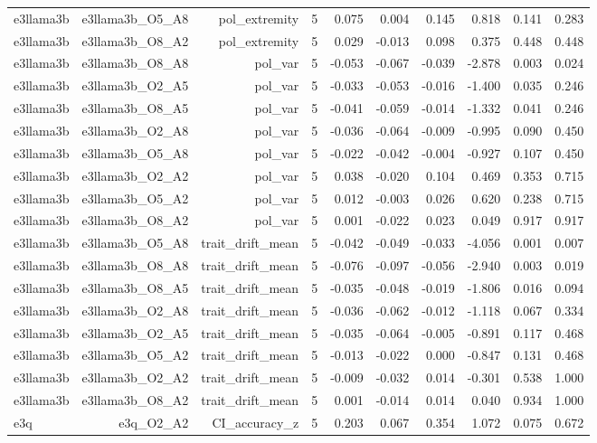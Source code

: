 \documentclass[11pt]{article}
\begin{document}
\begin{landscape}
\begin{longtable}{@{}lrrrrrrrrr@{}}
e3llama3b & e3llama3b\_O5\_A8 & pol\_extremity & 5 & 0.075 & 0.004 & 0.145 & 0.818 & 0.141 & 0.283 \\
e3llama3b & e3llama3b\_O8\_A2 & pol\_extremity & 5 & 0.029 & -0.013 & 0.098 & 0.375 & 0.448 & 0.448 \\
e3llama3b & e3llama3b\_O8\_A8 & pol\_var & 5 & -0.053 & -0.067 & -0.039 & -2.878 & 0.003 & 0.024 \\
e3llama3b & e3llama3b\_O2\_A5 & pol\_var & 5 & -0.033 & -0.053 & -0.016 & -1.400 & 0.035 & 0.246 \\
e3llama3b & e3llama3b\_O8\_A5 & pol\_var & 5 & -0.041 & -0.059 & -0.014 & -1.332 & 0.041 & 0.246 \\
e3llama3b & e3llama3b\_O2\_A8 & pol\_var & 5 & -0.036 & -0.064 & -0.009 & -0.995 & 0.090 & 0.450 \\
e3llama3b & e3llama3b\_O5\_A8 & pol\_var & 5 & -0.022 & -0.042 & -0.004 & -0.927 & 0.107 & 0.450 \\
e3llama3b & e3llama3b\_O2\_A2 & pol\_var & 5 & 0.038 & -0.020 & 0.104 & 0.469 & 0.353 & 0.715 \\
e3llama3b & e3llama3b\_O5\_A2 & pol\_var & 5 & 0.012 & -0.003 & 0.026 & 0.620 & 0.238 & 0.715 \\
e3llama3b & e3llama3b\_O8\_A2 & pol\_var & 5 & 0.001 & -0.022 & 0.023 & 0.049 & 0.917 & 0.917 \\
e3llama3b & e3llama3b\_O5\_A8 & trait\_drift\_mean & 5 & -0.042 & -0.049 & -0.033 & -4.056 & 0.001 & 0.007 \\
e3llama3b & e3llama3b\_O8\_A8 & trait\_drift\_mean & 5 & -0.076 & -0.097 & -0.056 & -2.940 & 0.003 & 0.019 \\
e3llama3b & e3llama3b\_O8\_A5 & trait\_drift\_mean & 5 & -0.035 & -0.048 & -0.019 & -1.806 & 0.016 & 0.094 \\
e3llama3b & e3llama3b\_O2\_A8 & trait\_drift\_mean & 5 & -0.036 & -0.062 & -0.012 & -1.118 & 0.067 & 0.334 \\
e3llama3b & e3llama3b\_O2\_A5 & trait\_drift\_mean & 5 & -0.035 & -0.064 & -0.005 & -0.891 & 0.117 & 0.468 \\
e3llama3b & e3llama3b\_O5\_A2 & trait\_drift\_mean & 5 & -0.013 & -0.022 & 0.000 & -0.847 & 0.131 & 0.468 \\
e3llama3b & e3llama3b\_O2\_A2 & trait\_drift\_mean & 5 & -0.009 & -0.032 & 0.014 & -0.301 & 0.538 & 1.000 \\
e3llama3b & e3llama3b\_O8\_A2 & trait\_drift\_mean & 5 & 0.001 & -0.014 & 0.014 & 0.040 & 0.934 & 1.000 \\
e3q & e3q\_O2\_A2 & CI\_accuracy\_z & 5 & 0.203 & 0.067 & 0.354 & 1.072 & 0.075 & 0.672 \\

\end{longtable}
\end{landscape}
\end{document}
